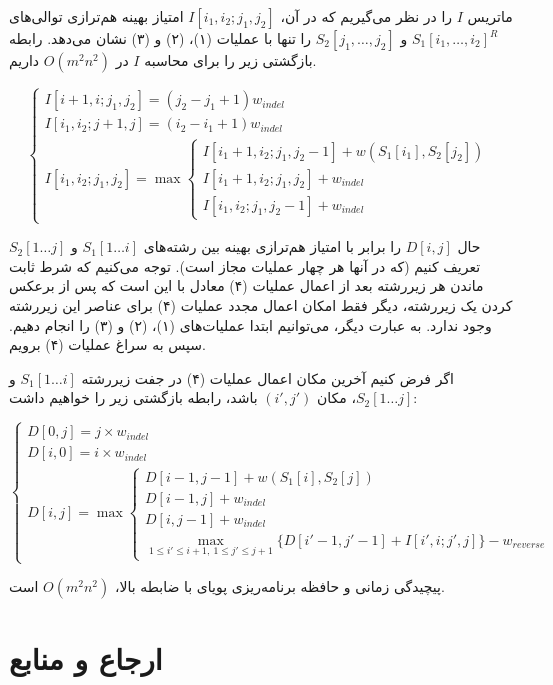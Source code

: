 \documentclass{scribe-cgenomics}
\begin{document}
\begin{حل}
ماتریس
$I$
را در نظر می‌گیریم که در آن،
$I[i_1,i_2;j_1,j_2]$
امتیاز بهینه هم‌ترازی توالی‌های
$S_1[i_1,\dots,i_2]^R$
و
$S_2[j_1,\dots,j_2]$
را تنها با عملیات
(۱)، (۲) و (۳)
نشان می‌دهد. رابطه بازگشتی زیر را برای محاسبه
$I$
در
$O(m^2n^2)$
داریم.

$$
\begin{cases}
I[i+1,i;j_1,j_2] = (j_2-j_1+1)w_{indel} \\
I[i_1, i_2; j+1,j] = (i_2-i_1+1)w_{indel} \\
{I[i_1,i_2;j_1,j_2] = \max
\begin{cases}
I[i_1+1,i_2;j_1,j_2-1] + w(S_1[i_1],S_2[j_2]) \\
I[i_1+1,i_2;j_1,j_2] + w_{indel} \\
I[i_1,i_2;j_1,j_2-1] + w_{indel}
\end{cases}
}
\end{cases}
$$

حال
$D[i,j]$
را برابر با امتیاز هم‌ترازی بهینه بین رشته‌های
$S_1[1\dots i]$
و
$S_2[1\dots j]$
تعریف کنیم (که در آنها هر چهار عملیات مجاز است). توجه می‌کنیم که شرط ثابت ماندن هر زیررشته بعد از اعمال عملیات (۴) معادل با این است که پس از برعکس کردن یک زیررشته، دیگر فقط امکان اعمال مجدد عملیات (۴) برای عناصر این زیررشته وجود ندارد. به عبارت دیگر، می‌توانیم ابتدا عملیات‌های
(۱)، (۲) و (۳) را انجام دهیم. سپس به سراغ عملیات (۴) برویم.

اگر فرض کنیم آخرین مکان اعمال عملیات (۴) در جفت زیررشته
$S_1[1\dots i]$
و
$S_2[1\dots j]$، 
مکان
$(i',j')$
باشد، رابطه بازگشتی زیر را خواهیم داشت:

$$
\begin{cases}
D[0,j] = j \times w_{indel}\\
D[i,0] = i \times w_{indel}\\
D[i,j] = \max
\begin{cases}
D[i-1,j-1] + w(S_1[i],S_2[j])\\
D[i-1,j]+ w_{indel}\\
D[i,j-1] + w_{indel}\\
\max _{1\leq i' \leq i+1,\ 1\leq j' \leq j+1} \{ D[i'-1,j'-1] + I[i',i;j',j] \} - w_{reverse}
\end{cases}
\end{cases}
$$

پیچیدگی زمانی و حافظه برنامه‌ریزی پویای با ضابطه بالا،
$O(m^2n^2)$
است.
\end{حل}



\section{ارجاع و منابع}




\end{document}
